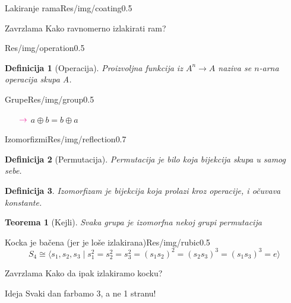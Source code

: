 \documentclass{beamer}
\newtheorem*{teo}{Teorema}
\newtheorem*{df}{Definicija}
\newenvironment{thinker}{\begin{alertblock}{Zavrzlama}}{\end{alertblock}}
\newenvironment{idea}{\begin{block}{Ideja}}{\end{block}}
\begin{document}
    
    
    \begin{framebg}{Lakiranje rama}{Res/img/coating}{0.5}
        \begin{thinker}
            Kako ravnomerno izlakirati ram?
        \end{thinker}
    \end{framebg}
    \begin{framebg}{}{Res/img/operation}{0.5}
        \pause
        \begin{df}[Operacija]
            Proizvoljna funkcija iz $A^n \to A$ naziva se $n$-arna operacija skupa A.
        \end{df}
    \end{framebg}
    \begin{framebg}{Grupe}{Res/img/group}{0.5}
        \begin{enumerate}
            \itemR $(a \circ b) \circ c = a \circ (b \circ c)$
            \itemR $\exists e \forall a \quad a \circ e = e \circ a = a$
            \itemR $\forall a \exists a^{-1}  \quad a \circ a^{-1} = a^{-1} \circ a = e$
            \item[${\color{magenta} \rightarrow}$] $a \oplus b = b \oplus a$
        \end{enumerate}
    \end{framebg}
    \begin{framebg}{Izomorfizmi}{Res/img/reflection}{0.7}
        \begin{df}[Permutacija]
            Permutacija je bilo koja bijekcija skupa u samog sebe.
        \end{df}
        \pause
        \begin{df}
            Izomorfizam je bijekcija koja prolazi kroz operacije,
            i očuvava konstante.
        \end{df}
        \pause
        \begin{teo}[Kejli]
            Svaka grupa je izomorfna nekoj grupi permutacija
        \end{teo}
    \end{framebg}
    \begin{framebg}{Kocka je bačena (jer je loše izlakirana)}{Res/img/rubic}{0.5}
        $$S_4 \cong \langle s_1, s_2, s_3 \mid 
            s_1^2 = s_2^2 = s_3^2 = (s_1s_2)^2 = (s_2s_3)^3 = (s_1s_3)^3 = e \rangle
        $$
        \pause
        \begin{thinker}
            Kako da ipak izlakiramo kocku?
        \end{thinker}
        \pause
        \begin{idea}
            Svaki dan farbamo 3, a ne 1 stranu!
        \end{idea}
    \end{framebg}
\end{document}
